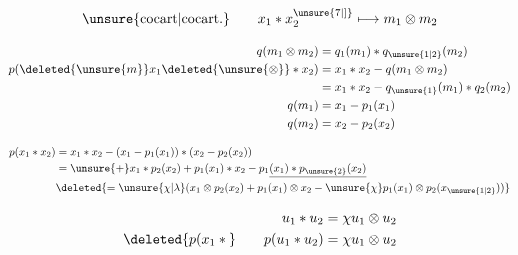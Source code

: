 


\[
\text{\unsure{cocart|cocart.}}\qquad x_1\ast x_2^{\unsure{7|]}}\longmapsto m_1\otimes m_2
\]

\[
\begin{aligned}
q(m_1\otimes m_2)&=q_1(m_1)\ast q_{\unsure{1|2}}(m_2)\\
p(\deleted{\unsure{m}}x_1\deleted{\unsure{\otimes}}\ast x_2)&=x_1\ast x_2-q(m_1\otimes m_2)\\
 &=x_1\ast x_2-q_{\unsure{1}}(m_1)\ast q_2(m_2)\\
q(m_1)&=x_1-p_1(x_1)\\
q(m_2)&=x_2-p_2(x_2)
\end{aligned}
\]

\[
\begin{aligned}
p(x_1\ast x_2)&=x_1\ast x_2-(x_1-p_1(x_1))\ast(x_2-p_2(x_2))\\
 &=\unsure{+}x_1\ast p_2(x_2)+p_{1}(x_1)\ast x_2-p_1\underline{(x_1)\ast p_{\unsure{2}}(x_2)}\\
 &\deleted{=\unsure{\chi|\lambda}(x_1\otimes p_2(x_2)+p_1(x_1)\otimes x_2-\unsure{\chi}p_1(x_1)\otimes p_2(x_{\unsure{1|2}}))}
\end{aligned}
\]

\[
\begin{aligned}
u_1\ast u_2&=\chi u_1\otimes u_2\\
\deleted{p(x_1\ast{}}\qquad p(u_1\ast u_2)&=\chi u_1\otimes u_2
\end{aligned}
\]

